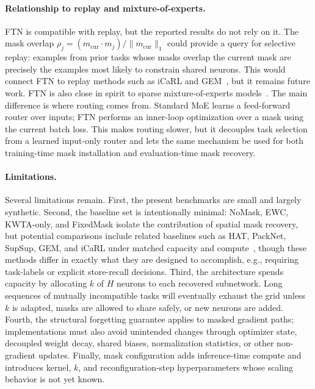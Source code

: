 \documentclass{article}
\begin{document}
\paragraph{Relationship to replay and mixture-of-experts.}
FTN is compatible with replay, but the reported results do not rely on it. The mask overlap $\rho_j=(m_{\mathrm{cur}}\cdot m_j)/\|m_{\mathrm{cur}}\|_1$ could provide a query for selective replay: examples from prior tasks whose masks overlap the current mask are precisely the examples most likely to constrain shared neurons. This would connect FTN to replay methods such as iCaRL and GEM~\citep{rebuffi2017icarl,lopez2017gradient}, but it remains future work. FTN is also close in spirit to sparse mixture-of-experts models~\citep{shazeer2017outrageously,fedus2022switch}. The main difference is where routing comes from. Standard MoE learns a feed-forward router over inputs; FTN performs an inner-loop optimization over a mask using the current batch loss. This makes routing slower, but it decouples task selection from a learned input-only router and lets the same mechanism be used for both training-time mask installation and evaluation-time mask recovery.


\paragraph{Limitations.}
Several limitations remain. First, the present benchmarks are small and largely synthetic. Second, the baseline set is intentionally minimal: NoMask, EWC, KWTA-only, and FixedMask isolate the contribution of spatial mask recovery, but potential comparisons include related baselines such as HAT, PackNet, SupSup, GEM, and iCaRL under matched capacity and compute~\citep{mallya2018packnet,serra2018overcoming,wortsman2020supermasks,lopez2017gradient,rebuffi2017icarl}, though these methods differ in exactly what they are designed to accomplish, e.g., requiring task-labels or explicit store-recall decisions.
Third, the architecture spends capacity by allocating $k$ of $H$ neurons to each recovered subnetwork. Long sequences of mutually incompatible tasks will eventually exhaust the grid unless $k$ is adapted, masks are allowed to share safely, or new neurons are added. Fourth, the structural forgetting guarantee applies to masked gradient paths; implementations must also avoid unintended changes through optimizer state, decoupled weight decay, shared biases, normalization statistics, or other non-gradient updates. Finally, mask configuration adds inference-time compute and introduces kernel, $k$, and reconfiguration-step hyperparameters whose scaling behavior is not yet known.
\end{document}
